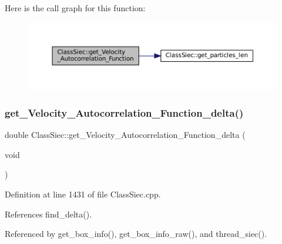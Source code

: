 Here is the call graph for this function\+:
\nopagebreak
\begin{figure}[H]
\begin{center}
\leavevmode
\includegraphics[width=350pt]{classClassSiec_acffa9f63d7236490d4e214a59e443140_cgraph}
\end{center}
\end{figure}
\mbox{\label{classClassSiec_a21be4d09c7aa47a5d3f216509ad5feef}} 
\subsubsection{\texorpdfstring{get\+\_\+\+Velocity\+\_\+\+Autocorrelation\+\_\+\+Function\+\_\+delta()}{get\_Velocity\_Autocorrelation\_Function\_delta()}}
{\footnotesize\ttfamily double Class\+Siec\+::get\+\_\+\+Velocity\+\_\+\+Autocorrelation\+\_\+\+Function\+\_\+delta (\begin{DoxyParamCaption}\item[{void}]{ }\end{DoxyParamCaption})}



Definition at line 1431 of file Class\+Siec.\+cpp.



References find\+\_\+delta().



Referenced by get\+\_\+box\+\_\+info(), get\+\_\+box\+\_\+info\+\_\+raw(), and thread\+\_\+siec().

